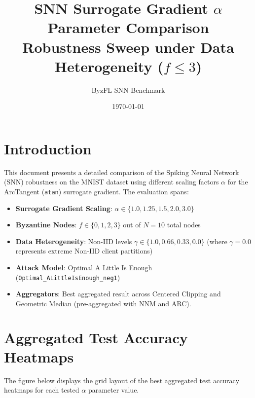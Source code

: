 \documentclass{article}
\title{SNN Surrogate Gradient $\alpha$ Parameter Comparison\\Robustness Sweep under Data Heterogeneity ($f \le 3$)}
\author{ByzFL SNN Benchmark}
\date{\today}
\begin{document}
\maketitle

\section{Introduction}
This document presents a detailed comparison of the Spiking Neural Network (SNN) robustness on the MNIST dataset using different scaling factors $\alpha$ for the ArcTangent (\texttt{atan}) surrogate gradient. The evaluation spans:
\begin{itemize}
    \item \textbf{Surrogate Gradient Scaling}: $\alpha \in \{1.0, 1.25, 1.5, 2.0, 3.0\}$
    \item \textbf{Byzantine Nodes}: $f \in \{0, 1, 2, 3\}$ out of $N=10$ total nodes
    \item \textbf{Data Heterogeneity}: Non-IID levels $\gamma \in \{1.0, 0.66, 0.33, 0.0\}$ (where $\gamma = 0.0$ represents extreme Non-IID client partitions)
    \item \textbf{Attack Model}: Optimal A Little Is Enough (\texttt{Optimal\_ALittleIsEnough\_neg1})
    \item \textbf{Aggregators}: Best aggregated result across Centered Clipping and Geometric Median (pre-aggregated with NNM and ARC).
\end{itemize}

\section{Aggregated Test Accuracy Heatmaps}
The figure below displays the grid layout of the best aggregated test accuracy heatmaps for each tested $\alpha$ parameter value.
\end{document}
